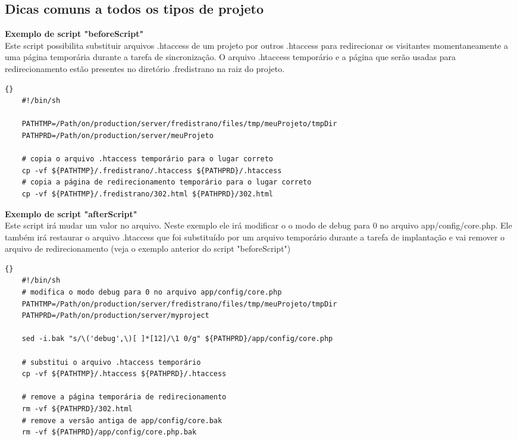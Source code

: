 \documentclass[12pt,a4paper]{report}
\begin{document}
\subsection{Dicas comuns a todos os tipos de projeto} %
\begin{list}{-}{}
\item \textbf{Exemplo de script "beforeScript"}\\
Este script possibilita substituir arquivos .htaccess de um projeto por outros .htaccess para redirecionar os visitantes momentaneamente a uma página temporária durante a tarefa de sincronização.  O arquivo .htaccess temporário e a página que serão usadas para redirecionamento estão presentes no diretório .fredistrano na raiz do projeto.

	\lstset{language=bash}
	\lstset{breaklines=true}
	\lstset{tabsize=1}
	\begin{lstlisting}[frame=tb]{}
	#!/bin/sh

	PATHTMP=/Path/on/production/server/fredistrano/files/tmp/meuProjeto/tmpDir
	PATHPRD=/Path/on/production/server/meuProjeto

	# copia o arquivo .htaccess temporário para o lugar correto
	cp -vf ${PATHTMP}/.fredistrano/.htaccess ${PATHPRD}/.htaccess
	# copia a página de redirecionamento temporário para o lugar correto
	cp -vf ${PATHTMP}/.fredistrano/302.html ${PATHPRD}/302.html
	\end{lstlisting}

\item \textbf{Exemplo de script "afterScript"}\\
Este script irá mudar um valor no arquivo.  Neste exemplo ele irá modificar o o modo de debug para 0 no arquivo app/config/core.php.  Ele também irá restaurar o arquivo .htaccess que foi substituído por um arquivo temporário durante a tarefa de implantação e vai remover o arquivo de redirecionamento (veja o exemplo anterior do script "beforeScript")
	\lstset{language=bash}
	\lstset{breaklines=true}
	\lstset{tabsize=1}
	\begin{lstlisting}[frame=tb]{}
	#!/bin/sh
	# modifica o modo debug para 0 no arquivo app/config/core.php
	PATHTMP=/Path/on/production/server/fredistrano/files/tmp/meuProjeto/tmpDir
	PATHPRD=/Path/on/production/server/myproject

	sed -i.bak "s/\('debug',\)[ ]*[12]/\1 0/g" ${PATHPRD}/app/config/core.php

	# substitui o arquivo .htaccess temporário
	cp -vf ${PATHTMP}/.htaccess ${PATHPRD}/.htaccess

	# remove a página temporária de redirecionamento
	rm -vf ${PATHPRD}/302.html
	# remove a versão antiga de app/config/core.bak
	rm -vf ${PATHPRD}/app/config/core.php.bak
	\end{lstlisting}


\end{list}
\end{document}
